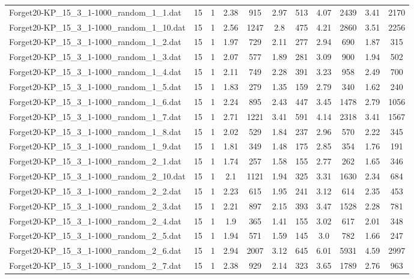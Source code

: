 \begin{table}[!ht]
\begin{tabular}{lcccccccccc}
Forget20-KP\_15\_3\_1-1000\_random\_1\_1.dat & 15 & 1 & 2.38 & 915 & 2.97 & 513 & 4.07 & 2439 & 3.41 & 2170 \\
Forget20-KP\_15\_3\_1-1000\_random\_1\_10.dat & 15 & 1 & 2.56 & 1247 & 2.8 & 475 & 4.21 & 2860 & 3.51 & 2256 \\
Forget20-KP\_15\_3\_1-1000\_random\_1\_2.dat & 15 & 1 & 1.97 & 729 & 2.11 & 277 & 2.94 & 690 & 1.87 & 315 \\
Forget20-KP\_15\_3\_1-1000\_random\_1\_3.dat & 15 & 1 & 2.07 & 577 & 1.89 & 281 & 3.09 & 900 & 1.94 & 502 \\
Forget20-KP\_15\_3\_1-1000\_random\_1\_4.dat & 15 & 1 & 2.11 & 749 & 2.28 & 391 & 3.23 & 958 & 2.49 & 700 \\
Forget20-KP\_15\_3\_1-1000\_random\_1\_5.dat & 15 & 1 & 1.83 & 279 & 1.35 & 159 & 2.79 & 340 & 1.62 & 240 \\
Forget20-KP\_15\_3\_1-1000\_random\_1\_6.dat & 15 & 1 & 2.24 & 895 & 2.43 & 447 & 3.45 & 1478 & 2.79 & 1056 \\
Forget20-KP\_15\_3\_1-1000\_random\_1\_7.dat & 15 & 1 & 2.71 & 1221 & 3.41 & 591 & 4.14 & 2318 & 3.41 & 1567 \\
Forget20-KP\_15\_3\_1-1000\_random\_1\_8.dat & 15 & 1 & 2.02 & 529 & 1.84 & 237 & 2.96 & 570 & 2.22 & 345 \\
Forget20-KP\_15\_3\_1-1000\_random\_1\_9.dat & 15 & 1 & 1.81 & 349 & 1.48 & 175 & 2.85 & 354 & 1.76 & 191 \\
Forget20-KP\_15\_3\_1-1000\_random\_2\_1.dat & 15 & 1 & 1.74 & 257 & 1.58 & 155 & 2.77 & 262 & 1.65 & 346 \\
Forget20-KP\_15\_3\_1-1000\_random\_2\_10.dat & 15 & 1 & 2.1 & 1121 & 1.94 & 325 & 3.31 & 1630 & 2.34 & 684 \\
Forget20-KP\_15\_3\_1-1000\_random\_2\_2.dat & 15 & 1 & 2.23 & 615 & 1.95 & 241 & 3.12 & 614 & 2.35 & 453 \\
Forget20-KP\_15\_3\_1-1000\_random\_2\_3.dat & 15 & 1 & 2.21 & 897 & 2.15 & 393 & 3.47 & 1528 & 2.28 & 781 \\
Forget20-KP\_15\_3\_1-1000\_random\_2\_4.dat & 15 & 1 & 1.9 & 365 & 1.41 & 155 & 3.02 & 617 & 2.01 & 348 \\
Forget20-KP\_15\_3\_1-1000\_random\_2\_5.dat & 15 & 1 & 1.94 & 571 & 1.59 & 145 & 3.0 & 782 & 1.66 & 247 \\
Forget20-KP\_15\_3\_1-1000\_random\_2\_6.dat & 15 & 1 & 2.94 & 2007 & 3.12 & 645 & 6.01 & 5931 & 4.59 & 2997 \\
Forget20-KP\_15\_3\_1-1000\_random\_2\_7.dat & 15 & 1 & 2.38 & 929 & 2.14 & 323 & 3.65 & 1789 & 2.76 & 963 \\

\end{tabular}
\end{table}
